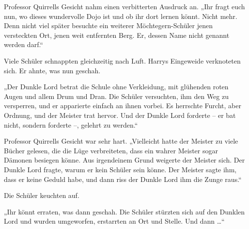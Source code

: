 Professor Quirrells Gesicht nahm einen verbitterten Ausdruck an. „Ihr fragt euch nun, wo dieses wundervolle Dojo ist und ob ihr dort lernen könnt. Nicht mehr. Denn nicht viel später besuchte ein weiterer Möchtegern-Schüler jenen versteckten Ort, jenen weit entfernten Berg. Er, dessen Name nicht genannt werden darf.“

Viele Schüler schnappten gleichzeitig nach Luft. Harrys Eingeweide verknoteten sich. Er ahnte, was nun geschah.

„Der Dunkle Lord betrat die Schule ohne Verkleidung, mit glühenden roten Augen und allem Drum und Dran. Die Schüler versuchten, ihm den Weg zu versperren, und er apparierte einfach an ihnen vorbei. Es herrschte Furcht, aber Ordnung, und der Meister trat hervor. Und der Dunkle Lord forderte – er bat nicht, sondern forderte –, gelehrt zu werden.“

Professor Quirrells Gesicht war sehr hart. „Vielleicht hatte der Meister zu viele Bücher gelesen, die die Lüge verbreiteten, dass ein wahrer Meister sogar Dämonen besiegen könne. Aus irgendeinem Grund weigerte der Meister sich. Der Dunkle Lord fragte, warum er kein Schüler sein könne. Der Meister sagte ihm, dass er keine Geduld habe, und dann riss der Dunkle Lord ihm die Zunge raus.“

Die Schüler keuchten auf.

„Ihr könnt erraten, was dann geschah. Die Schüler stürzten sich auf den Dunklen Lord und wurden umgeworfen, erstarrten an Ort und Stelle. Und dann …“

